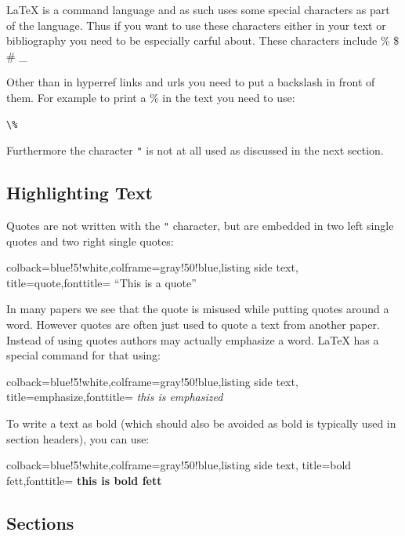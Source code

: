 LaTeX is a command language and as such uses some special characters as
part of the language. Thus if you want to use these characters either in
your text or bibliography you need to be especially carful about. These
characters include \% \$ \# \_

Other than in hyperref links and urls you need to put a backslash in
front of them. For example to print a \% in the text you need to use:

\begin{verbatim}
\%
\end{verbatim}

Furthermore the character \verb|"| is not at all used as discussed in the next
section.

\subsection{Highlighting Text}\label{highlighting-text}

Quotes are not written with the \verb|"| character, but are embedded in two
left single quotes and two right single quotes:



\begin{tcblisting}{colback=blue!5!white,colframe=gray!50!blue,listing side text,
  title=quote,fonttitle=\bfseries}
``This is a quote''
\end{tcblisting}



In many papers we see that the quote is misused while putting quotes
around a word. However quotes are often just used to quote a text from
another paper. Instead of using quotes authors may actually emphasize a
word. LaTeX has a special command for that using:

\begin{tcblisting}{colback=blue!5!white,colframe=gray!50!blue,listing side text,
  title=emphasize,fonttitle=\bfseries}
\textit{this is emphasized}
\end{tcblisting}

To write a text as bold (which should also be avoided as bold is
typically used in section headers), you can use:

\begin{tcblisting}{colback=blue!5!white,colframe=gray!50!blue,listing side text,
  title=bold fett,fonttitle=\bfseries}
{\bf this is bold fett}
\end{tcblisting}

\subsection{Sections}\label{sections}

